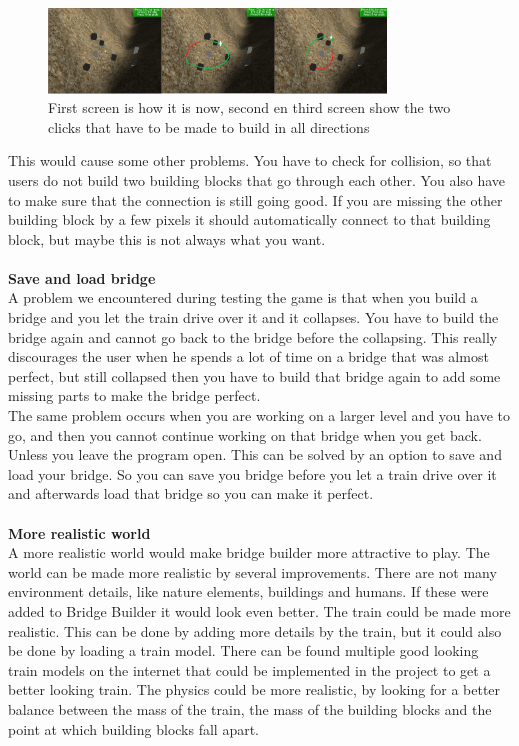 \begin{figure}[H]
    \centering
    \includegraphics[width=0.8\textwidth]{screenshots/TwoClick.png}
    \caption{First screen is how it is now, second en third screen show the two clicks that have to be made to build in all directions}
    \label{fig:twoclick}
\end{figure}
This would cause some other problems. You have to check for collision, so that users do not build two building blocks that go through each other. You also have to make sure that the connection is still going good. If you are missing the other building block by a few pixels it should automatically connect to that building block, but maybe this is not always what you want.  \\ \\
\textbf{Save and load bridge}\\
A problem we encountered during testing the game is that when you build a bridge and you let the train drive over it and it collapses. You have to build the bridge again and cannot go back to the bridge before the collapsing. This really discourages the user when he spends a lot of time on a bridge that was almost perfect, but still collapsed then you have to build that bridge again to add some missing parts to make the bridge perfect. \\
The same problem occurs when you are working on a larger level and you have to go, and then you cannot continue working on that bridge when you get back. Unless you leave the program open.  This can be solved by an option to save and load your bridge. So you can save you bridge before you let a train drive over it and afterwards load that bridge so you can make it perfect.\\ \\
\textbf{More realistic world}\\
A more realistic world would make bridge builder more attractive to play. The world can be made more realistic by several improvements. 
There are not many environment details, like nature elements, buildings and humans. If these were added to Bridge Builder it would look even better.
The train could be made more realistic. This can be done by adding more details by the train, but it could also be done by loading a train model. There can be found multiple good looking train models on the internet that could be implemented in the project to get a better looking train.
The physics could be more realistic, by looking for a better balance between the mass of the train, the mass of the building blocks and the point at which building blocks fall apart. 
